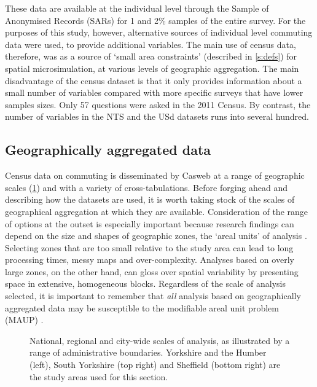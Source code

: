 \documentclass[a4paper, 11pt, twoside]{Thesis}
\begin{document}
These data are available at the individual level through the Sample of
Anonymised Records (SARs) for 1 and 2\% samples of the entire survey.
For the purposes of this study, however, alternative sources of individual
level commuting data were used, to provide additional variables. The main
use of census data, therefore, was as a source of `small area constraints'
(described in \cref{s:defs})
for spatial microsimulation, at various levels of geographic aggregation. 
The main disadvantage of the census
dataset is that it only provides information about a small number of variables
compared with more specific surveys that have lower samples sizes. Only 57
questions were asked in the 2011 Census. By contrast, the number of variables
in the NTS and the USd datasets runs into several hundred.

\subsection{Geographically aggregated data} 
\label{sgeoaggdata}
Census data on commuting is disseminated by Casweb at a range of geographic
scales (\cref{f:scales}) and with a variety of cross-tabulations. Before
forging ahead and describing how the datasets are used, it is worth taking stock
of the scales of geographical aggregation at which they are available.
Consideration of the range
of options at the outset is especially important because research
findings can depend on the size and shapes of geographic zones,
the `areal units' of analysis \citep{Horner2002, Openshaw1983}. Selecting zones
that are too small relative to the study  
area can lead to long processing times, messy maps and over-complexity.
Analyses based on overly large zones, on the other hand, can gloss over
spatial variability by presenting space in extensive, homogeneous blocks.
Regardless of the scale of analysis selected, it is important to remember that
\emph{all} analysis based on geographically aggregated data may be susceptible
to the modifiable areal unit problem (MAUP) \citep{Wong2009}.

\begin{figure}
\caption[National, regional and city-wide scales of analysis]{National, regional
and city-wide scales of analysis, as illustrated
by a range of administrative boundaries. Yorkshire and the Humber (left),
South Yorkshire (top right) and Sheffield (bottom right)
are the study areas used for this section.}
\label{f:scales}
\end{figure}
\end{document}
